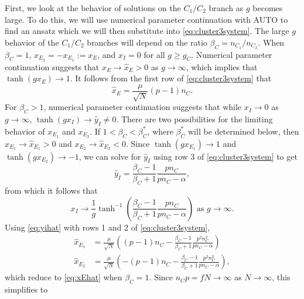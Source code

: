 \documentclass[reqno]{siamonline190516}
\begin{document}
First, we look at the behavior of solutions on the $C_1/C_2$ branch as $g$ becomes large. To do this, we will use numerical parameter continuation with AUTO to find an ansatz which we will then substitute into \cref{eq:cluster3system}. The large $g$ behavior of the $C_1/C_2$ branches will depend on the ratio $\beta_C = n_{C_1}/n_{C_2}$. When $\beta_C = 1$, $x_{E_2} = -x_{E_1} := x_E$, and $x_I = 0$ for all $g \geq g_C$. Numerical parameter continuation suggests that $x_{E} \rightarrow \hat{x}_{E} > 0$ as $g \rightarrow \infty$, which implies that $\tanh(g x_{E}) \rightarrow 1$. It follows from the first row of \cref{eq:cluster3system} that 
\begin{equation}\label{eq:xEhat}
\hat{x}_{E} = \frac{\mu}{\sqrt{N}}(p-1)n_C.
\end{equation}
For $\beta_C > 1$, numerical parameter continuation suggests that while $x_I \rightarrow 0$ as $g \rightarrow \infty$, $\tanh(g x_I) \rightarrow \hat{y}_I \neq 0$. There are two possibilities for the limiting behavior of $x_{E_1}$ and $x_{E_2}$. If $1 < \beta_C < \beta_C^*$, where $\beta_C^*$ will be determined below, then $x_{E_1} \rightarrow \hat{x}_{E_1} > 0$ and $x_{E_2} \rightarrow \hat{x}_{E_2} < 0$. Since $\tanh(g x_{E_1}) \rightarrow 1$ and $\tanh(g x_{E_2}) \rightarrow -1$, we can solve for $\hat{y}_I$ using row 3 of \cref{eq:cluster3system} to get
\begin{equation}\label{eq:yihat}
    \hat{y}_I = \frac{\beta_C - 1}{\beta_C+1} \frac{p n_C}{p n_C - \alpha},
\end{equation} 
from which it follows that
\begin{equation}\label{eq:xilimiteq}
    x_I \rightarrow \frac{1}{g}\tanh^{-1}\left( \frac{\beta_C - 1}{\beta_C+1} \frac{p n_C}{p n_C - \alpha} \right) \text{ as } g \rightarrow \infty.
\end{equation}
Using \cref{eq:yihat} with rows 1 and 2 of \cref{eq:cluster3system},
\begin{equation}\label{eq:xEhat12}
\begin{aligned}
    \hat{x}_{E_1} &= \frac{\mu}{\sqrt{N}}\left( (p-1)n_C - \frac{\beta_C - 1}{\beta_C+1} \frac{p^2 n_C^2}{p n_C - \alpha} \right) \\
    \hat{x}_{E_2} &= \frac{\mu}{\sqrt{N}}\left( -(p-1)n_C - \frac{\beta_C - 1}{\beta_C+1} \frac{p^2 n_C^2}{p n_C - \alpha} \right),
\end{aligned}
\end{equation}
which reduce to \cref{eq:xEhat} when $\beta_C = 1$. Since $n_C p = f N \rightarrow \infty$ as $N \rightarrow \infty$, this simplifies to
\end{document}
